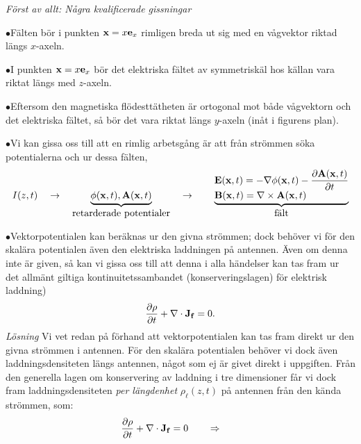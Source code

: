 {{{{{{\noindent
{\it F{\"o}rst av allt: N{\aa}gra kvalificerade gissningar}
\smallskip
\noindent
\item{$\bullet$}{F{\"a}lten b{\"o}r i punkten ${\bf x}=x{\bf e}_x$ rimligen
    breda ut sig med en v{\aa}gvektor riktad l{\"a}ngs $x$-axeln.}
\item{$\bullet$}{I punkten ${\bf x}=x{\bf e}_x$ b{\"o}r det elektriska
    f{\"a}ltet av symmetrisk{\"a}l hos k{\"a}llan vara riktat l{\"a}ngs
    med $z$-axeln.}
\item{$\bullet$}{Eftersom den magnetiska fl{\"o}destt{\"a}theten {\"a}r
    ortogonal mot b{\aa}de v{\aa}gvektorn och det elektriska f{\"a}ltet,
    s{\aa} b{\"o}r det vara riktat l{\"a}ngs $y$-axeln (in{\aa}t i figurens
    plan).}
\item{$\bullet$}{Vi kan gissa oss till att en rimlig arbetsg{\aa}ng {\"a}r
    att fr{\aa}n str{\"o}mmen s{\"o}ka potentialerna och ur dessa f{\"a}lten,
    $$
      I(z,t)\quad\to\quad
      \underbrace{\phi({\bf x},t),{\bf A}({\bf x},t)}_{\hbox{retarderade
          potentialer}}
      \quad\to\qquad
      \underbrace{
        \vbox{
          \hbox{$\displaystyle
	    {\bf E}({\bf x},t)=-\nabla\phi({\bf x},t)
	        -{{\partial{\bf A}({\bf x},t)}\over{\partial t}}$}
          \hbox{$\displaystyle
	    {\bf B}({\bf x},t)=\nabla\times{\bf A}({\bf x},t)$}
	}
      }_{\hbox{f{\"a}lt}}
    $$}
\item{$\bullet$}{Vektorpotentialen kan ber{\"a}knas ur den givna str{\"o}mmen;
    dock beh{\"o}ver vi f{\"o}r den skal{\"a}ra potentialen {\"a}ven den
    elektriska laddningen p{\aa} antennen. {\"A}ven om denna inte {\"a}r
    given, s{\aa} kan vi gissa oss till att denna i alla h{\"a}ndelser kan
    tas fram ur det allm{\"a}nt giltiga kontinuitetssambandet
    (konserveringslagen) f{\"o}r elektrisk laddning)
    $$
      {{\partial\rho}\over{\partial t}}+\nabla\cdot{\bf J}_{\bf f}=0.
    $$}
\vfill\eject
\noindent
{\it L{\"o}sning}
\smallskip
\noindent
Vi vet redan p{\aa} f{\"o}rhand att vektorpotentialen kan tas fram direkt ur
den givna str{\"o}mmen i antennen. F{\"o}r den skal{\"a}ra potentialen
beh{\"o}ver vi dock {\"a}ven laddningsdensiteten l{\"a}ngs antennen, n{\aa}got
som ej {\"a}r givet direkt i uppgiften. Fr{\aa}n den generella lagen om
konservering av laddning i tre dimensioner f{\aa}r vi dock fram
laddningsdensiteten {\it per l{\"a}ngdenhet} $\rho_{\ell}(z,t)$ p{\aa}
antennen fr{\aa}n den k{\"a}nda str{\"o}mmen, som:
$$
  {{\partial\rho}\over{\partial t}}+\nabla\cdot{\bf J}_{\bf f}=0
    \qquad\Rightarrow\qquad
$$}}}}}}
